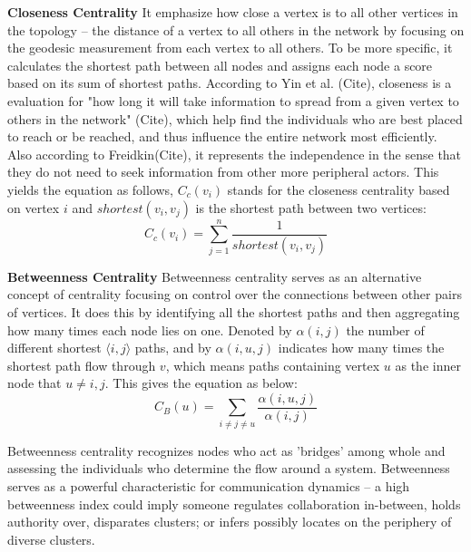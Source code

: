 \documentclass[letterpaper, 10 pt, conference]{ieeeconf}  %
\begin{document}
\textbf{Closeness Centrality}
 It emphasize how close a vertex is to all other vertices in the topology -- the distance of a vertex to all others in the network by focusing on the geodesic measurement from each vertex to all others. To be more specific, it calculates the shortest path between all nodes and assigns each node a score based on its sum of shortest paths. According to Yin et al. (Cite), closeness is a evaluation for "how long it will take information to spread from a given vertex to others in the network" (Cite), which help find the individuals who are best placed to reach or be reached, and thus influence the entire network most efficiently. Also according to Freidkin(Cite), it represents the independence in the sense that they do not need to seek information from other more peripheral actors.
This yields the equation as follows, $C_{c}(v_{i})$ stands for the closeness centrality based on vertex $i$ and $shortest(v_{i},v_{j})$ is the shortest path between two vertices:
\begin{equation}
C_{c}(v_{i}) = \sum_{j = 1}^{n} \frac{1}{shortest(v_{i}, v_{j})}
\label{C}
\end{equation}

\textbf{Betweenness Centrality}
Betweenness centrality serves as an alternative concept of centrality focusing on control over the connections between other pairs of vertices. It does this by identifying all the shortest paths and then aggregating how many times each node lies on one. Denoted by $\alpha (i, j)$ the number of different shortest $\langle i, j \rangle$ paths, and by $\alpha (i, u, j)$ indicates how many times the shortest path flow through $v$, which means paths containing vertex $u$ as the inner node that $ u \neq i, j$. This gives the equation as below:
\begin{equation}
C_{B}(u) = \sum_{i \neq j \neq u}^{} \frac{\alpha (i, u, j) }{\alpha (i, j)}
\label{C}
\end{equation}

Betweenness centrality recognizes nodes who act as 'bridges' among whole and assessing the individuals who determine the flow around a system. Betweenness serves as a powerful characteristic for communication dynamics -- a high betweenness index could imply someone regulates collaboration in-between, holds authority over, disparates clusters; or infers possibly locates on the periphery of diverse clusters.
\end{document}
